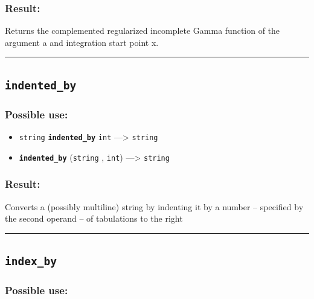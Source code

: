 \documentclass[]{book}
\providecommand{\tightlist}{%
  \setlength{\itemsep}{0pt}\setlength{\parskip}{0pt}}
\theoremstyle{definition}
\theoremstyle{definition}
\theoremstyle{definition}
\theoremstyle{remark}
\begin{document}
\subsubsection{Result:}\label{result-261}

Returns the complemented regularized incomplete Gamma function of the
argument a and integration start point x.

\begin{center}\rule{0.5\linewidth}{\linethickness}\end{center}

\subsection{\texorpdfstring{\texttt{indented\_by}}{indented\_by}}\label{indented_by}

\subsubsection{Possible use:}\label{possible-use-272}

\begin{itemize}
\tightlist
\item
  \texttt{string} \textbf{\texttt{indented\_by}} \texttt{int}
  ---\textgreater{} \texttt{string}
\item
  \textbf{\texttt{indented\_by}} (\texttt{string} , \texttt{int})
  ---\textgreater{} \texttt{string}
\end{itemize}

\subsubsection{Result:}\label{result-262}

Converts a (possibly multiline) string by indenting it by a number --
specified by the second operand -- of tabulations to the right

\begin{center}\rule{0.5\linewidth}{\linethickness}\end{center}

\subsection{\texorpdfstring{\texttt{index\_by}}{index\_by}}\label{index_by}

\subsubsection{Possible use:}\label{possible-use-273}
\end{document}
